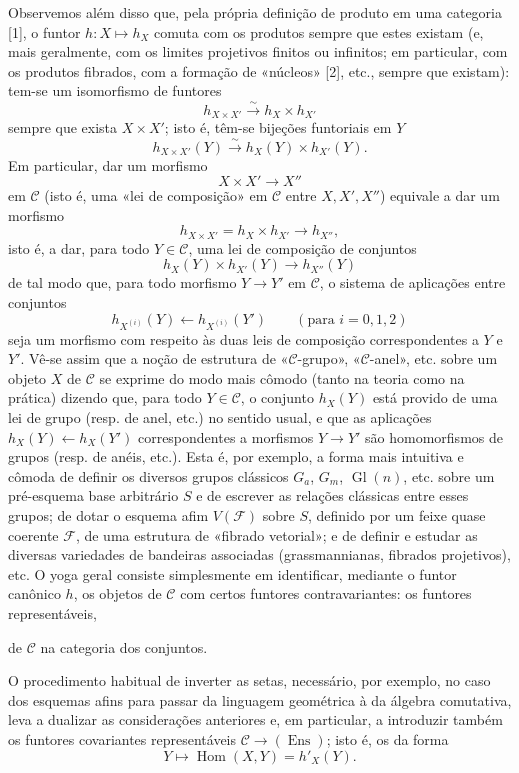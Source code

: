 \documentclass[11pt,twoside,openany]{book}
\numberwithin{equation}{section}
\newcommand{\src}[1]{%
  \phantomsection\hypertarget{src:#1}{}%
  \marginpar{\raggedleft\footnotesize\sffamily #1}%
}
\theoremstyle{plain}
\theoremstyle{definition}
\theoremstyle{remark}
\newcommand{\FgaUnitKey}{frontmatter}
\renewcommand{\src}[1]{%
  \phantomsection\hypertarget{src:\FgaUnitKey:#1}{}%
  \marginpar{\raggedleft\footnotesize\sffamily #1}%
}
\begin{document}
\src{370}
Observemos além disso que, pela própria definição de produto em uma categoria
[1], o funtor $h:X\longmapsto h_X$ comuta com os produtos sempre que estes
existam (e, mais geralmente, com os limites projetivos finitos ou infinitos;
em particular, com os produtos fibrados, com a formação de «núcleos» [2],
etc., sempre que existam): tem-se um isomorfismo de funtores
\[
  h_{X\times X'}\xrightarrow{\sim}h_X\times h_{X'}
\]
sempre que exista $X\times X'$; isto é, têm-se bijeções funtoriais
em $Y$
\[
  h_{X\times X'}(Y)\xrightarrow{\sim}h_X(Y)\times h_{X'}(Y).
\]
Em particular, dar um morfismo
\[
  X\times X'\longrightarrow X''
\]
em $\mathcal C$ (isto é, uma «lei de composição» em $\mathcal C$ entre
$X,X',X''$) equivale a dar um morfismo
\[
  h_{X\times X'}=h_X\times h_{X'}\longrightarrow h_{X''},
\]
isto é, a dar, para todo $Y\in\mathcal C$, uma lei de composição de
conjuntos
\[
  h_X(Y)\times h_{X'}(Y)\longrightarrow h_{X''}(Y)
\]
de tal modo que, para todo morfismo $Y\longrightarrow Y'$ em $\mathcal C$, o
sistema de aplicações entre conjuntos
\[
  h_{X^{(i)}}(Y)\longleftarrow h_{X^{(i)}}(Y')
  \qquad(\text{para }i=0,1,2)
\]
seja um morfismo com respeito às duas leis de composição correspondentes a
$Y$ e $Y'$. Vê-se assim que a noção de estrutura de «$\mathcal C$-grupo»,
«$\mathcal C$-anel», etc. sobre um objeto $X$ de $\mathcal C$ se exprime do
modo mais cômodo (tanto na teoria como na prática) dizendo que, para
todo $Y\in\mathcal C$, o conjunto $h_X(Y)$ está provido de uma lei de grupo
(resp. de anel, etc.) no sentido usual, e que as aplicações
$h_X(Y)\longleftarrow h_X(Y')$ correspondentes a morfismos
$Y\longrightarrow Y'$ são homomorfismos de grupos (resp. de anéis, etc.).
Esta é, por exemplo, a forma mais intuitiva e cômoda de definir os diversos
grupos clássicos $G_a$, $G_m$, $\operatorname{Gl}(n)$, etc. sobre um pré-esquema
base arbitrário $S$ e de escrever as relações clássicas entre esses grupos;
de dotar o esquema afim $V(\mathcal F)$ sobre $S$, definido por um feixe
quase coerente $\mathcal F$, de uma estrutura de «fibrado vetorial»; e de
definir e estudar as diversas variedades de bandeiras associadas
(grassmannianas, fibrados projetivos), etc. O yoga geral consiste
simplesmente em identificar, mediante o funtor canônico $h$, os objetos de
$\mathcal C$ com certos funtores contravariantes: os funtores representáveis,

\src{371}
de $\mathcal C$ na categoria dos conjuntos.

O procedimento habitual de inverter as setas, necessário, por exemplo, no
caso dos esquemas afins para passar da linguagem geométrica à da álgebra
comutativa, leva a dualizar as considerações anteriores e, em
particular, a introduzir também os funtores covariantes representáveis
$\mathcal C\longrightarrow(\operatorname{Ens})$; isto é, os da forma
\[
  Y\longmapsto\operatorname{Hom}(X,Y)=h'_X(Y).
\]
\end{document}
